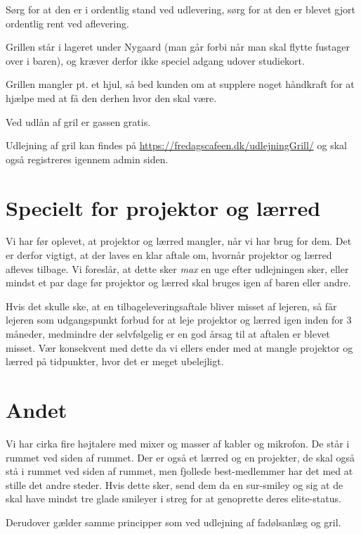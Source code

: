 Sørg for at den er i ordentlig stand ved udlevering, sørg for at den er blevet gjort ordentlig rent ved aflevering.

Grillen står i lageret under Nygaard (man går forbi når man skal flytte fustager over i baren), og kræver derfor ikke speciel adgang udover studiekort.

Grillen mangler pt. et hjul, så bed kunden om at supplere noget håndkraft for at hjælpe med at få den derhen hvor den skal være.

Ved udlån af gril er gassen gratis.

Udlejning af gril kan findes på \url{https://fredagscafeen.dk/udlejningGrill/} og skal også registreres igennem admin siden.

\section{Specielt for projektor og lærred}
Vi har før oplevet, at projektor og lærred mangler, når vi har brug for dem. Det er derfor vigtigt, at der laves en klar aftale om, hvornår projektor og lærred afleves tilbage. Vi foreslår, at dette sker \textit{max} en uge efter udlejningen sker, eller mindst et par dage før projektor og lærred skal bruges igen af baren eller andre.

Hvis det skulle ske, at en tilbageleveringsaftale bliver misset af lejeren, så får lejeren som udgangspunkt forbud for at leje projektor og lærred igen inden for 3 måneder, medmindre der selvfølgelig er en god årsag til at aftalen er blevet misset. Vær konsekvent med dette da vi ellers ender med at mangle projektor og lærred på tidpunkter, hvor det er meget ubelejligt.

\section{Andet}
Vi har cirka fire højtalere med mixer og masser af kabler og mikrofon. De står i rummet ved siden af rummet. Der er også et lærred og en projekter, de skal også stå i rummet ved siden af rummet, men fjollede best-medlemmer har det med at stille det andre steder. Hvis dette sker, send dem da en sur-smiley og sig at de skal have mindst tre glade smileyer i streg for at genoprette deres elite-status.

Derudover gælder samme principper som ved udlejning af fadølsanlæg og gril.



